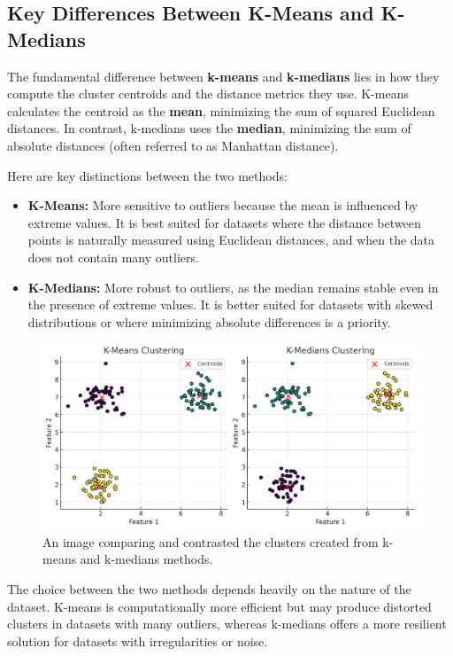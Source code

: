 \subsection{Key Differences Between K-Means and K-Medians}
\begin{flushleft}
    \large The fundamental difference between \textbf{k-means} and \textbf{k-medians} lies in how they compute the cluster centroids and the distance metrics they use. K-means calculates the centroid as the \textbf{mean}, minimizing the sum of squared Euclidean distances. In contrast, k-medians uses the \textbf{median}, minimizing the sum of absolute distances (often referred to as Manhattan distance).

    Here are key distinctions between the two methods:
    
    \begin{itemize}
        \item \textbf{K-Means:} More sensitive to outliers because the mean is influenced by extreme values. It is best suited for datasets where the distance between points is naturally measured using Euclidean distances, and when the data does not contain many outliers.
        
        \item \textbf{K-Medians:} More robust to outliers, as the median remains stable even in the presence of extreme values. It is better suited for datasets with skewed distributions or where minimizing absolute differences is a priority.
    \end{itemize}

    \begin{figure}[H]
        \centering
        \includegraphics[width=0.45\linewidth]{ml/K-clustering.png}
        \caption{ An image comparing and contrasted the clusters created from k-means and k-medians methods.}
        \label{fig:K-clustering}
    \end{figure}
    
    The choice between the two methods depends heavily on the nature of the dataset. K-means is computationally more efficient but may produce distorted clusters in datasets with many outliers, whereas k-medians offers a more resilient solution for datasets with irregularities or noise.
\end{flushleft}

